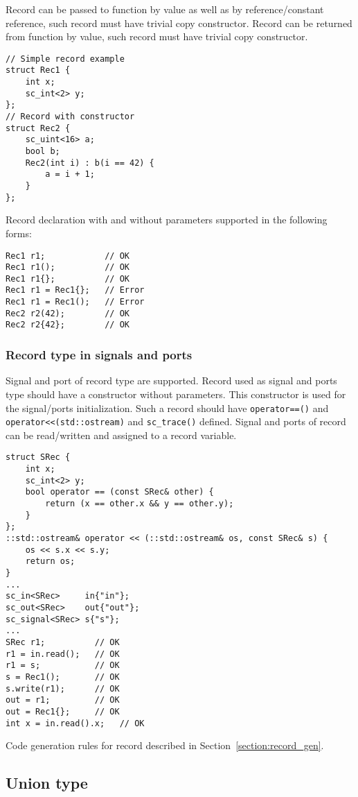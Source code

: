 Record can be passed to function by value as well as by reference/constant reference, such record must have trivial copy constructor. Record can be returned from function by value, such record must have trivial copy constructor.
%
\begin{lstlisting}[style=mycpp]
// Simple record example
struct Rec1 {
    int x;
    sc_int<2> y;
};
// Record with constructor
struct Rec2 {
    sc_uint<16> a;       
    bool b;
    Rec2(int i) : b(i == 42) {
        a = i + 1;
    }
};
\end{lstlisting}

Record declaration with and without parameters supported in the following forms:
%
\begin{lstlisting}[style=mycpp]
Rec1 r1;        	// OK
Rec1 r1();        	// OK
Rec1 r1{};        	// OK
Rec1 r1 = Rec1{}; 	// Error
Rec1 r1 = Rec1();  	// Error
Rec2 r2(42);    	// OK
Rec2 r2{42};    	// OK
\end{lstlisting}

\subsubsection{Record type in signals and ports}

Signal and port of record type are supported. Record used as signal and ports type should have a constructor without parameters. This constructor is used for the signal/ports initialization. Such a record should have {\tt operator==()} and {\tt operator<<(std::ostream)} and {\tt sc\_trace()} defined.
Signal and ports of record can be read/written and assigned to a record variable.
%
\begin{lstlisting}[style=mycpp]
struct SRec {
    int x;
    sc_int<2> y;
    bool operator == (const SRec& other) {
        return (x == other.x && y == other.y);
    } 
};
::std::ostream& operator << (::std::ostream& os, const SRec& s) {
    os << s.x << s.y;
    return os;
}
...
sc_in<SRec>     in{"in"};
sc_out<SRec>    out{"out"};
sc_signal<SRec> s{"s"};
...
SRec r1;          // OK
r1 = in.read();   // OK
r1 = s;           // OK
s = Rec1();       // OK
s.write(r1);      // OK
out = r1;         // OK
out = Rec1{};     // OK
int x = in.read().x;   // OK
\end{lstlisting}
 
Code generation rules for record described in Section~\ref{section:record_gen}. 


\subsection{Union type}

